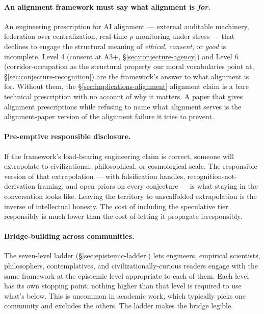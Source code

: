 \documentclass[11pt,a4paper]{article}
\begin{document}
\paragraph{An alignment framework must say what alignment is \emph{for}.} An engineering prescription for AI alignment --- external auditable machinery, federation over centralization, real-time $\rho$ monitoring under stress --- that declines to engage the structural meaning of \emph{ethical}, \emph{consent}, or \emph{good} is incomplete. Level 4 (consent at A3+, \S\ref{sec:conjecture-agency}) and Level 6 (corridor-occupation as the structural property our moral vocabularies point at, \S\ref{sec:conjecture-recognition}) are the framework's answer to what alignment is for. Without them, the \S\ref{sec:implications-alignment} alignment claim is a bare technical prescription with no account of why it matters. A paper that gives alignment prescriptions while refusing to name what alignment serves is the alignment-paper version of the alignment failure it tries to prevent.

\paragraph{Pre-emptive responsible disclosure.} If the framework's load-bearing engineering claim is correct, someone will extrapolate to civilizational, philosophical, or cosmological scale. The responsible version of that extrapolation --- with falsification handles, recognition-not-derivation framing, and open priors on every conjecture --- is what staying in the conversation looks like. Leaving the territory to unscaffolded extrapolation is the inverse of intellectual honesty. The cost of including the speculative tier responsibly is much lower than the cost of letting it propagate irresponsibly.

\paragraph{Bridge-building across communities.} The seven-level ladder (\S\ref{sec:epistemic-ladder}) lets engineers, empirical scientists, philosophers, contemplatives, and civilizationally-curious readers engage with the same framework at the epistemic level appropriate to each of them. Each level has its own stopping point; nothing higher than that level is required to use what's below. This is uncommon in academic work, which typically picks one community and excludes the others. The ladder makes the bridge legible.
\end{document}
